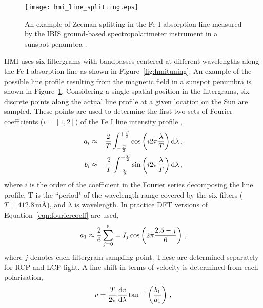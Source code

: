 \begin{figure}[!t]
\centerline{\texttt{[image: hmi\_line\_splitting.eps]}}
\caption[An example of Zeeman splitting of the Fe I line.]{An example of Zeeman splitting in the Fe I absorption line measured by the IBIS ground-based spectropolarimeter instrument in a sunspot penumbra \citep[from][]{Norton:2006}.}
\label{fig:hmisplitting}
\end{figure}

HMI uses six filtergrams with bandpasses centered at different wavelengths along the Fe I absorption line as shown in Figure~\ref{fig:hmituning}. An example of the possible line profile resulting from the magnetic field in a sunspot penumbra is shown in Figure~\ref{fig:hmisplitting}. Considering a single spatial position in the filtergrams, six discrete points along the actual line profile at a given location on the Sun are sampled. These points are used to determine the first two 
sets of Fourier coefficients ($i=[1,2]$) of the Fe I line intensity profile \citep{Couvidat:2012},
\begin{eqnarray}\label{eqn:fouriercoeff}
a_i &\approx& \frac{2}{T}\int^{+\frac{T}{2}}_{-\frac{T}{2}} \cos \left( i 2\pi \frac{\lambda}{T} \right)\mathrm{d}\lambda \mbox{\,,} \\
b_i &\approx& \frac{2}{T}\int^{+\frac{T}{2}}_{-\frac{T}{2}} \sin \left( i 2\pi \frac{\lambda}{T} \right)\mathrm{d}\lambda \mbox{\,,}
\end{eqnarray}
where $i$ is the order of the coefficient in the Fourier series decomposing the line profile, T is the ``period" of the wavelength range covered by the six filters ($T=412.8$\,m\AA), and $\lambda$ is wavelength.
In practice DFT versions of Equation~\ref{eqn:fouriercoeff} are used,
\begin{equation}\label{eqn:discfourcoeff}
a_1 \approx \frac{2}{6}\sum\limits^5_{j=0}=I_j \cos \left( 2\pi \frac{2.5-j}{6} \right) \mbox{\,,}
\end{equation}
where $j$ denotes each filtergram sampling point. These are determined separately for \gls{RCP} and  \gls{LCP} light. A line shift in terms of velocity is determined from each polarisation,
\begin{equation}
v= \frac{T}{2\pi} \frac{\mathrm{d}v}{\mathrm{d}\lambda} \tan^{-1}\left(\frac{b_1}{a_1}\right) \mbox{\,,}
\end{equation}

